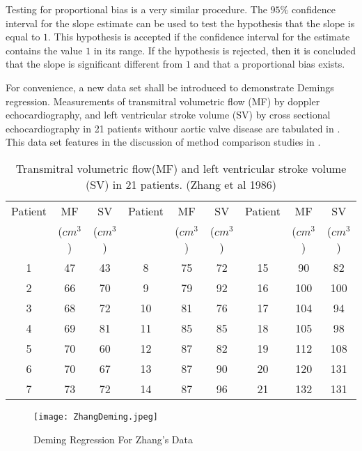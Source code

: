 \documentclass[12pt, a4paper]{report}
\theoremstyle{plain}
\theoremstyle{definition}
\theoremstyle{remark}
\begin{document}
Testing for proportional bias is a very similar procedure. The
$95\%$ confidence interval for the slope estimate can be used to
test the hypothesis that the slope is equal to $1$. This
hypothesis is accepted if the confidence interval for the estimate
contains the value $1$ in its range. If the hypothesis is
rejected, then it is concluded that the slope is significant
different from $1$ and that a proportional bias exists.

For convenience, a new data set shall be introduced to demonstrate
Demings regression. Measurements of transmitral volumetric flow
(MF) by doppler echocardiography, and left ventricular stroke
volume (SV) by cross sectional echocardiography in 21 patients
withour aortic valve disease are tabulated in \citet{zhang}. This
data set features in the discussion of method comparison studies
in \citet[p.398]{AltmanBook} .

\newpage
\begin{table}[h!]
	\begin{center}
		\begin{tabular}{|c|c|c||c|c|c||c|c|c|}
			\hline
			Patient & MF  & SV  & Patient & MF  & SV  & Patient & MF  & SV \\
			&($cm^{3}$)&  ($cm^{3}$) & &($cm^{3}$)&  ($cm^{3}$) & &($cm^{3}$)&  ($cm^{3}$)
			\\
			\hline
			1 & 47 & 43 &  8 & 75 & 72 &  15 & 90 & 82 \\
			2 & 66 & 70 & 9 & 79 & 92 &  16 & 100 & 100 \\
			3 & 68 & 72 & 10 & 81 & 76 & 17 & 104 & 94 \\
			4 & 69 & 81 & 11 & 85 & 85 &  18 & 105 & 98 \\
			5 & 70 & 60 & 12 & 87 & 82 & 19 & 112 & 108 \\
			6 & 70 & 67 & 13 & 87 & 90 & 20 & 120 & 131 \\
			7 & 73 & 72 & 14 & 87 & 96 &  21 & 132 & 131 \\
			
			\hline
		\end{tabular}
		\caption{Transmitral volumetric flow(MF) and left ventricular
			stroke volume (SV) in 21 patients. (Zhang et al 1986)}
	\end{center}
\end{table}
\newpage
\begin{figure}[h!]
	\texttt{[image: ZhangDeming.jpeg]}
	\caption{Deming Regression For Zhang's Data}\label{ZhangDeming}
\end{figure}
\end{document}
